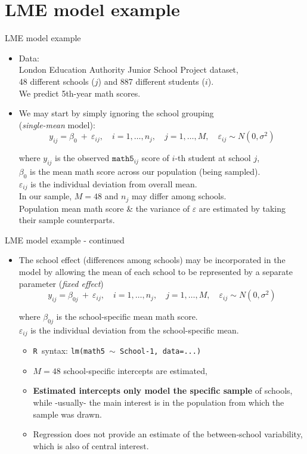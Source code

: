 \documentclass{beamer}
\newcommand{\Rko}{\texttt{R~}}
\begin{document}
\section{LME model example}
\begin{frame}{LME model example}
\begin{itemize}
\item Data: \\London Education Authority Junior School Project
dataset, \\48 different schools ($j$) and 887 different students ($i$). \\We predict 5th-year math scores.
\medskip
\item We may start by simply ignoring the school grouping \\(\textit{single-mean} model):
$$ y_{ij} = \beta_0~+~\varepsilon_{ij}, \quad i=1,\dots,n_j,  \quad j=1,\dots, M,  \quad \varepsilon_{ij} \sim N(0,\sigma^2) $$

where $y_{ij}$ is the observed $\texttt{math5}_{ij}$ score of $i$-th student at school $j$,\\
$\beta_0$ is the mean math score across our population (being sampled).\\
$\varepsilon_{ij}$ is the individual deviation from overall mean.\\
\medskip
In our sample, $M=48$ and $n_j$ may differ among schools.\\ 
\medskip
Population mean math score \& the variance of $\varepsilon$ are estimated by taking their sample counterparts.
\end{itemize}
\end{frame}
\begin{frame}{LME model example - continued}
\begin{itemize}
\item The school effect (differences among schools) may be incorporated in the model by allowing the mean of each school to be represented by a separate parameter (\textit{fixed effect})
$$ y_{ij} = \beta_{0j}~+~\varepsilon_{ij}, \quad i=1,\dots,n_j,  \quad j=1,\dots, M,  \quad \varepsilon_{ij} \sim N(0,\sigma^2) $$

where $\beta_{0j}$ is the school-specific mean math score.\\
$\varepsilon_{ij}$ is the individual deviation from the school-specific mean.\\
\smallskip
\begin{itemize}
\item \Rko syntax: \texttt{lm(math5 $\sim$ School-1, data=...)}
\item $M=48$ school-specific intercepts are estimated,
\item \textbf{Estimated intercepts only model the specific sample}  of schools, while -usually- the main interest is in the population from which the sample was drawn.
\item Regression does not provide an estimate of the between-school variability, which is also of central interest.
\end{itemize}
\end{itemize}
\end{frame}
\end{document}
